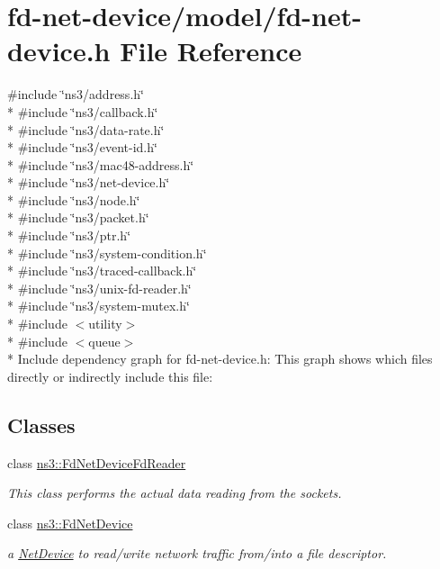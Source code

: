 \hypertarget{fd-net-device_8h}{}\section{fd-\/net-\/device/model/fd-\/net-\/device.h File Reference}
\label{fd-net-device_8h}
{\ttfamily \#include \char`\"{}ns3/address.\+h\char`\"{}}\\*
{\ttfamily \#include \char`\"{}ns3/callback.\+h\char`\"{}}\\*
{\ttfamily \#include \char`\"{}ns3/data-\/rate.\+h\char`\"{}}\\*
{\ttfamily \#include \char`\"{}ns3/event-\/id.\+h\char`\"{}}\\*
{\ttfamily \#include \char`\"{}ns3/mac48-\/address.\+h\char`\"{}}\\*
{\ttfamily \#include \char`\"{}ns3/net-\/device.\+h\char`\"{}}\\*
{\ttfamily \#include \char`\"{}ns3/node.\+h\char`\"{}}\\*
{\ttfamily \#include \char`\"{}ns3/packet.\+h\char`\"{}}\\*
{\ttfamily \#include \char`\"{}ns3/ptr.\+h\char`\"{}}\\*
{\ttfamily \#include \char`\"{}ns3/system-\/condition.\+h\char`\"{}}\\*
{\ttfamily \#include \char`\"{}ns3/traced-\/callback.\+h\char`\"{}}\\*
{\ttfamily \#include \char`\"{}ns3/unix-\/fd-\/reader.\+h\char`\"{}}\\*
{\ttfamily \#include \char`\"{}ns3/system-\/mutex.\+h\char`\"{}}\\*
{\ttfamily \#include $<$utility$>$}\\*
{\ttfamily \#include $<$queue$>$}\\*
Include dependency graph for fd-\/net-\/device.h\+:
This graph shows which files directly or indirectly include this file\+:
\subsection*{Classes}
\begin{DoxyCompactItemize}
\item 
class \hyperlink{classns3_1_1FdNetDeviceFdReader}{ns3\+::\+Fd\+Net\+Device\+Fd\+Reader}
\begin{DoxyCompactList}\small\item\em This class performs the actual data reading from the sockets. \end{DoxyCompactList}\item 
class \hyperlink{classns3_1_1FdNetDevice}{ns3\+::\+Fd\+Net\+Device}
\begin{DoxyCompactList}\small\item\em a \hyperlink{classns3_1_1NetDevice}{Net\+Device} to read/write network traffic from/into a file descriptor. \end{DoxyCompactList}\end{DoxyCompactItemize}
